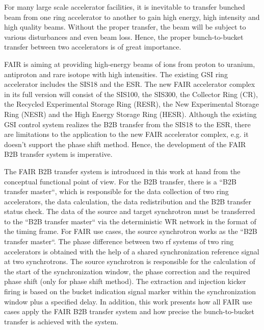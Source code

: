 For many large scale accelerator facilities, it is inevitable to transfer bunched beam from one ring accelerator to another to gain high energy, high intensity and high quality beams. Without the proper transfer, the beam will be subject to various disturbances and even beam loss. Hence, the proper bunch-to-bucket transfer between two accelerators is of great importance. 

FAIR is aiming at providing high-energy beams of ions from proton to uranium, antiproton and rare isotope with high intensities. The existing GSI ring accelerator includes the SIS18 and the ESR. The new FAIR accelerator complex in its full version will consist of the SIS100, the SIS300, the Collector Ring (CR), the Recycled Experimental Storage Ring (RESR), the New Experimental Storage Ring (NESR) and the High Energy Storage Ring (HESR). Although the existing GSI control system realizes the B2B transfer from the SIS18 to the ESR, there are limitations to the application to the new FAIR accelerator complex, e.g. it doesn't support the phase shift method. Hence, the development of the FAIR B2B transfer system is imperative. 

The FAIR B2B transfer system is introduced in this work at hand from the conceptual functional point of view. For the B2B transfer, there is a “B2B transfer master“, which is responsible for the data collection of two ring accelerators, the data calculation, the data redistribution and the B2B transfer status check. The data of the source and target synchrotron must be transferred to the “B2B transfer master“ via the deterministic WR network in the format of the timing frame. For FAIR use cases, the source synchrotron works as the ``B2B transfer master``. The phase difference between two rf systems of two ring accelerators is obtained with the help of a shared synchronization reference signal at two synchrotrons. The source synchrotron is responsible for the calculation of the start of the synchronization window, the phase correction and the required phase shift (only for phase shift method). The extraction and injection kicker firing is based on the bucket indication signal marker within the synchronization window plus a specified delay. In addition, this work presents how all FAIR use cases apply the FAIR B2B transfer system and how precise the bunch-to-bucket transfer is achieved with the system. 

